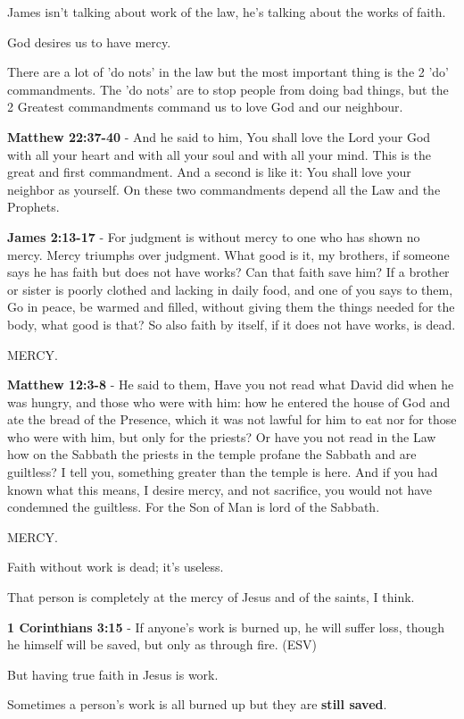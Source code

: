 \documentclass[11pt]{article}
\begin{document}
James isn't talking about work of the law, he's talking about the works of faith.

God desires us to have mercy.

There are a lot of 'do nots' in the law but the most important thing is the 2 'do' commandments.
The 'do nots' are to stop people from doing bad things, but the 2 Greatest commandments command us to love God and our neighbour.

\textbf{Matthew 22:37-40} - And he said to him, You shall love the Lord your God with all your heart and with all your soul and with all your mind. This is the great and first commandment. And a second is like it: You shall love your neighbor as yourself. On these two commandments depend all the Law and the Prophets.

\textbf{James 2:13-17} - For judgment is without mercy to one who has shown no mercy. Mercy triumphs over judgment. What good is it, my brothers, if someone says he has faith but does not have works? Can that faith save him? If a brother or sister is poorly clothed and lacking in daily food, and one of you says to them, Go in peace, be warmed and filled, without giving them the things needed for the body, what good is that? So also faith by itself, if it does not have works, is dead.

MERCY.

\textbf{Matthew 12:3-8} - He said to them, Have you not read what David did when he was hungry, and those who were with him: how he entered the house of God and ate the bread of the Presence, which it was not lawful for him to eat nor for those who were with him, but only for the priests? Or have you not read in the Law how on the Sabbath the priests in the temple profane the Sabbath and are guiltless? I tell you, something greater than the temple is here. And if you had known what this means, I desire mercy, and not sacrifice, you would not have condemned the guiltless. For the Son of Man is lord of the Sabbath.

MERCY.

Faith without work is dead; it's useless.

That person is completely at the mercy of Jesus and of the saints, I think.

\textbf{1 Corinthians 3:15} - If anyone's work is burned up, he will suffer loss, though he himself will be saved, but only as through fire. (ESV)

But having true faith in Jesus is work.

Sometimes a person's work is all burned up but they are \textbf{still saved}.
\end{document}
